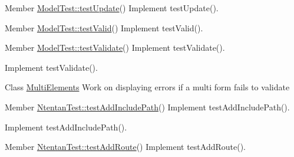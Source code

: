\label{todo__todo000037}
\hypertarget{todo__todo000037}{}
 
\begin{DoxyDescription}
\item[Member \hyperlink{class_model_test_a8286d41bdc07488a633b6153751f4d86}{ModelTest::testUpdate}() ]Implement testUpdate().
\end{DoxyDescription}

\label{todo__todo000051}
\hypertarget{todo__todo000051}{}
 
\begin{DoxyDescription}
\item[Member \hyperlink{class_model_test_a3b684ddeb500dfdbd105eb9d8c27c281}{ModelTest::testValid}() ]Implement testValid().
\end{DoxyDescription}

\label{todo__todo000055}
\hypertarget{todo__todo000055}{}
 
\begin{DoxyDescription}
\item[Member \hyperlink{class_model_test_acdfbdc2dbaaea9c9eeb65e432e3cc998}{ModelTest::testValidate}() ]Implement testValidate().

Implement testValidate().
\end{DoxyDescription}

\label{todo__todo000387}
\hypertarget{todo__todo000387}{}
 
\begin{DoxyDescription}
\item[Class \hyperlink{class_multi_elements}{MultiElements} ]Work on displaying errors if a multi form fails to validate 
\end{DoxyDescription}

\label{todo__todo000091}
\hypertarget{todo__todo000091}{}
 
\begin{DoxyDescription}
\item[Member \hyperlink{class_ntentan_test_a25954a594bd0034f0d7e1eb1726c10f4}{NtentanTest::testAddIncludePath}() ]Implement testAddIncludePath().

Implement testAddIncludePath().
\end{DoxyDescription}

\label{todo__todo000245}
\hypertarget{todo__todo000245}{}
 
\begin{DoxyDescription}
\item[Member \hyperlink{class_ntentan_test_ad43133e7705de1d451e03f3387ac108c}{NtentanTest::testAddRoute}() ]Implement testAddRoute().
\end{DoxyDescription}

